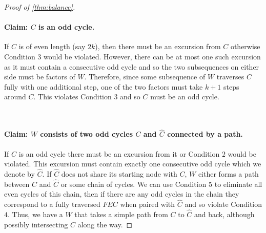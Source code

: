 \begin{proof}[Proof of \cref{thm:balance}]
    ~\paragraph{Claim: $C$ is an odd cycle. }
    If $C$ is of even length (say $2k$), then there must be an excursion from $C$ otherwise Condition $3$ would be violated. However, there can be at most one such excursion as it must contain a consecutive odd cycle and so the two subsequences on either side must be factors of $W$. Therefore, since some subsequence of $W$ traverses $C$ fully with one additional step, one of the two factors must take $k+1$ steps around $C$. This violates Condition $3$ and so $C$ must be an odd cycle.

    ~\paragraph{Claim: $W$ consists of two odd cycles $C$ and $\hat{C}$ connected by a path. }
    If $C$ is an odd cycle there must be an excursion from it or Condition $2$ would be violated. This excursion must contain exactly one consecutive odd cycle which we denote by $\hat{C}$. If $\hat{C}$ does not share its starting node with $C$, $W$ either forms a path between $C$ and $\hat{C}$ or some chain of cycles. We can use Condition $5$ to eliminate all even cycles of this chain, then if there are any odd cycles in the chain they correspond to a fully traversed $FEC$ when paired with $\hat{C}$ and so violate Condition $4$. Thus, we have a $W$ that takes a simple path from $C$ to $\hat{C}$ and back, although possibly intersecting $C$ along the way.

\end{proof}
